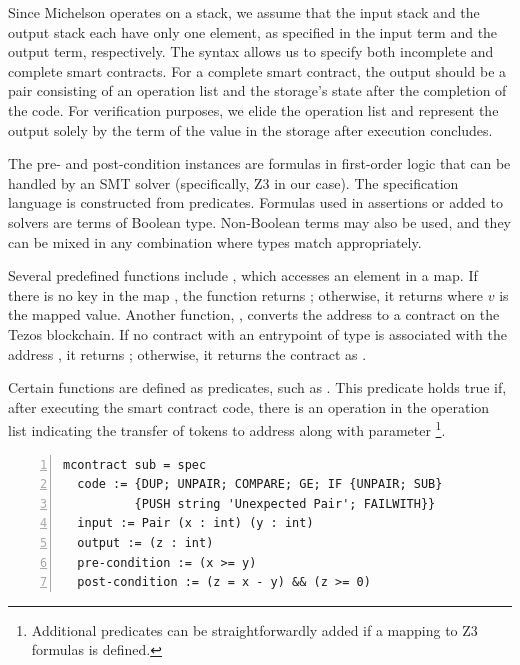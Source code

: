 \documentclass[runningheads]{llncs}
\begin{document}
Since Michelson operates on a stack, we assume that the input stack and the output stack each have only one element, as specified in the input term and the output term, respectively. The syntax allows us to specify both incomplete and complete smart contracts. For a complete smart contract, the output should be a pair consisting of an operation list and the storage's state after the completion of the code. For verification purposes, we elide the operation list and represent the output solely by the term of the value in the storage after execution concludes. %

The pre- and post-condition instances are formulas in first-order logic that can be handled by an SMT solver (specifically, Z3 in our case). The specification language is constructed from predicates. Formulas used in assertions or added to solvers are terms of Boolean type. Non-Boolean terms may also be used, and they can be mixed in any combination where types match appropriately.

Several predefined functions include , which accesses an element in a map. If there is no key  in the map , the function returns ; otherwise, it returns  where $v$ is the mapped value. Another function, , converts the address  to a contract on the Tezos blockchain. If no contract with an entrypoint of type  is associated with the address , it returns ; otherwise, it returns the contract as .

Certain functions are defined as predicates, such as . This predicate holds true if, after executing the smart contract code, there is an operation in the operation list indicating the transfer of  tokens to address  along with parameter \footnote{Additional predicates can be straightforwardly added if a mapping to Z3 formulas is defined.}.
\begin{lstlisting}[float,captionpos=b,caption={Specification of  the \lstinline/sub/ contract},label={lst:sub-contract-specification},numbers=left]
mcontract sub = spec
  code := {DUP; UNPAIR; COMPARE; GE; IF {UNPAIR; SUB} 
          {PUSH string 'Unexpected Pair'; FAILWITH}}
  input := Pair (x : int) (y : int)
  output := (z : int)
  pre-condition := (x >= y)
  post-condition := (z = x - y) && (z >= 0)
\end{lstlisting}
\end{document}
